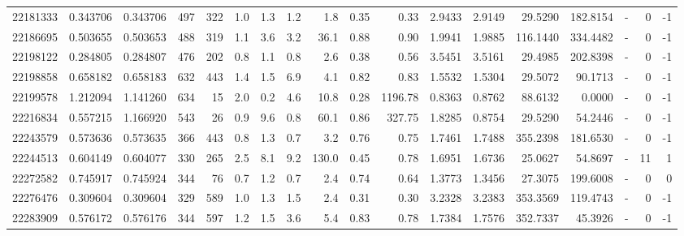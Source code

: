 \begin{tabular}{rrrrrrrrrrrrrrrlrr}
  22181333 & 0.343706 &   0.343706 &  497 &  322 &      1.0 &      1.3 &     1.2 &      1.8 &       0.35 &        0.33 &  2.9433 &  2.9149 &   29.5290 &  182.8154 &             - &        0 &         -1 \\
  22186695 & 0.503655 &   0.503653 &  488 &  319 &      1.1 &      3.6 &     3.2 &     36.1 &       0.88 &        0.90 &  1.9941 &  1.9885 &  116.1440 &  334.4482 &             - &        0 &         -1 \\
  22198122 & 0.284805 &   0.284807 &  476 &  202 &      0.8 &      1.1 &     0.8 &      2.6 &       0.38 &        0.56 &  3.5451 &  3.5161 &   29.4985 &  202.8398 &             - &        0 &         -1 \\
  22198858 & 0.658182 &   0.658183 &  632 &  443 &      1.4 &      1.5 &     6.9 &      4.1 &       0.82 &        0.83 &  1.5532 &  1.5304 &   29.5072 &   90.1713 &             - &        0 &         -1 \\
  22199578 & 1.212094 &   1.141260 &  634 &   15 &      2.0 &      0.2 &     4.6 &     10.8 &       0.28 &     1196.78 &  0.8363 &  0.8762 &   88.6132 &    0.0000 &             - &        0 &         -1 \\
  22216834 & 0.557215 &   1.166920 &  543 &   26 &      0.9 &      9.6 &     0.8 &     60.1 &       0.86 &      327.75 &  1.8285 &  0.8754 &   29.5290 &   54.2446 &             - &        0 &         -1 \\
  22243579 & 0.573636 &   0.573635 &  366 &  443 &      0.8 &      1.3 &     0.7 &      3.2 &       0.76 &        0.75 &  1.7461 &  1.7488 &  355.2398 &  181.6530 &             - &        0 &         -1 \\
  22244513 & 0.604149 &   0.604077 &  330 &  265 &      2.5 &      8.1 &     9.2 &    130.0 &       0.45 &        0.78 &  1.6951 &  1.6736 &   25.0627 &   54.8697 &             - &       11 &          1 \\
  22272582 & 0.745917 &   0.745924 &  344 &   76 &      0.7 &      1.2 &     0.7 &      2.4 &       0.74 &        0.64 &  1.3773 &  1.3456 &   27.3075 &  199.6008 &             - &        0 &          0 \\
  22276476 & 0.309604 &   0.309604 &  329 &  589 &      1.0 &      1.3 &     1.5 &      2.4 &       0.31 &        0.30 &  3.2328 &  3.2383 &  353.3569 &  119.4743 &             - &        0 &         -1 \\
  22283909 & 0.576172 &   0.576176 &  344 &  597 &      1.2 &      1.5 &     3.6 &      5.4 &       0.83 &        0.78 &  1.7384 &  1.7576 &  352.7337 &   45.3926 &             - &        0 &         -1 \\

\end{tabular}
